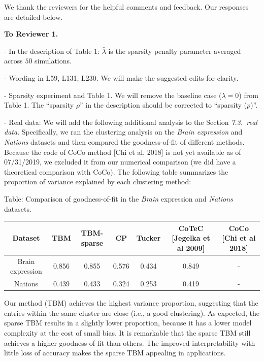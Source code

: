 \documentclass{article}
\begin{document}
We thank the reviewers for the helpful comments and feedback. Our responses are detailed below.

{\bf To Reviewer 1.} 
\vspace{-.15cm}

- In the description of Table 1:  $\bar \lambda$ is the sparsity penalty parameter averaged across $50$ simulations. 

- Wording in L59, L131, L230. We will make the suggested edits for clarity. 

- Sparsity experiment and Table 1. We will remove the baseline case ($\lambda=0$) from Table 1. The ``sparsity $\rho$'' in the description should be corrected to ``sparsity ($p$)''. 

- Real data: %
We will add the following additional analysis to the Section \emph{7.3.\ real data}. Specifically, we ran the clustering analysis on the \emph{Brain expression} and \emph{Nations} datasets and then compared the goodness-of-fit of different methods. Because the code of CoCo method [Chi et al, 2018] is not yet available as of 07/31/2019, we excluded it from our numerical comparison (we did have a theoretical comparison with CoCo). The following table summarizes the proportion of variance explained by each clustering method:
\vspace{-.15cm}
\begin{center}
\caption{Table: Comparison of goodness-of-fit in the \emph{Brain} expression and \emph{Nations} datasets.}
\begin{tabular}{c|cccccc}
Dataset& {\color{red}TBM} & {\color{red}TBM-sparse}&  CP&Tucker & CoTeC [Jegelka et al 2009]&CoCo [Chi et al 2018]\\
\hline
Brain expression&{\color{red}0.856}&{\color{red}0.855}&0.576&0.434&0.849&-\\
Nations&{\color{red}0.439}&{\color{red}0.433}&0.324&0.253&0.419&-\\
\end{tabular}
\end{center}
\vspace{-.15cm}
Our method (TBM) achieves the highest variance proportion, suggesting that the entries within the same cluster are close (i.e., a good clustering). As expected, the sparse TBM results in a slightly lower proportion, because it has a lower model complexity at the cost of small bias. It is remarkable that the sparse TBM still achieves a higher goodness-of-fit than others. The improved interpretability with little loss of accuracy makes the sparse TBM appealing in applications. 
\end{document}
